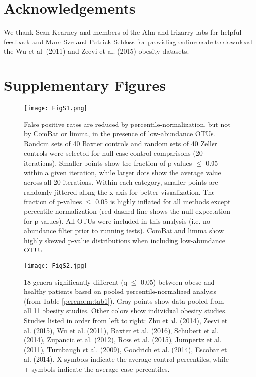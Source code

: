 \section{Acknowledgements}

We thank Sean Kearney and members of the Alm and Irizarry labs for helpful feedback and Marc Sze and Patrick Schloss for providing online code to download the Wu et al. (2011) and Zeevi et al. (2015) obesity datasets.

\section{Supplementary Figures}

\begin{figure}[h]
\begin{center}
    \texttt{[image: FigS1.png]}
    \caption{False positive rates are reduced by percentile-normalization, but not by ComBat or limma, in the presence of low-abundance OTUs. Random sets of 40 Baxter controls and random sets of 40 Zeller controls were selected for null case-control comparisons (20 iterations). Smaller points show the fraction of p-values $\leq$ 0.05 within a given iteration, while larger dots show the average value across all 20 iterations. Within each category, smaller points are randomly jittered along the x-axis for better visualization. The fraction of p-values $\leq$ 0.05 is highly inflated for all methods except percentile-normalization (red dashed line shows the null-expectation for p-values). All OTUs were included in this analysis (i.e. no abundance filter prior to running tests). ComBat and limma show highly skewed p-value distributions when including low-abundance OTUs.}\label{percnorm:figS1}
\end{center}
\end{figure}

\begin{figure}[h]
\begin{center}
    \texttt{[image: FigS2.jpg]}
    \caption{18 genera significantly different (q $\leq$ 0.05) between obese and healthy patients based on pooled percentile-normalized analysis (from Table \ref{percnorm:tab1}). Gray points show data pooled from all 11 obesity studies. Other colors show individual obesity studies. Studies listed in order from left to right: Zhu et al. (2014), Zeevi et al. (2015), Wu et al. (2011), Baxter et al. (2016), Schubert et al. (2014), Zupancic et al. (2012), Ross et al. (2015), Jumpertz et al. (2011), Turnbaugh et al. (2009), Goodrich et al. (2014), Escobar et al. (2014). X symbols indicate the average control percentiles, while + symbols indicate the average case percentiles.}\label{percnorm:figS2}
\end{center}
\end{figure}

